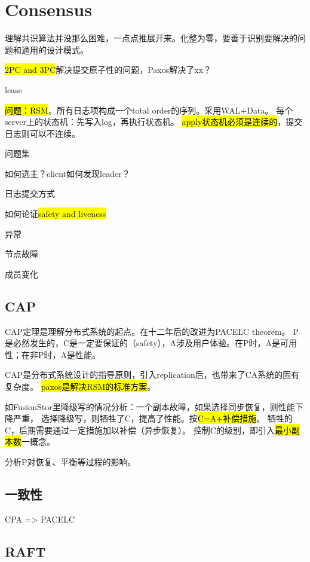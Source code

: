\chapter{Consensus}

理解共识算法并没那么困难，一点点推展开来。化整为零，要善于识别要解决的问题和通用的设计模式。

\hl{2PC and 3PC}解决提交原子性的问题，Paxos解决了xx？

lease

\hl{问题：RSM}。所有日志项构成一个total order的序列。采用WAL+Data。
每个server上的状态机：先写入log，再执行状态机。
\hl{apply状态机必须是连续的}，提交日志则可以不连续。

问题集
\begin{enumbox}
\item 如何选主？client如何发现leader？
\item 日志提交方式
\item 如何论证\hl{safety and liveness}
\end{enumbox}

异常
\begin{enumbox}
\item 节点故障
\item 成员变化
\end{enumbox}

\section{CAP}

CAP定理是理解分布式系统的起点。在十二年后的改进为PACELC theorem。
P是必然发生的，C是一定要保证的（safety），A涉及用户体验。在P时，A是可用性；在非P时，A是性能。

CAP是分布式系统设计的指导原则，引入replication后，也带来了CA系统的固有复杂度。
\hl{paxos是解决RSM的标准方案}。

\hrulefill

如FusionStor里降级写的情况分析：一个副本故障，如果选择同步恢复，则性能下降严重，
选择降级写，则牺牲了C，提高了性能。按\hl{C=A+补偿措施}。
牺牲的C，后期需要通过一定措施加以补偿（异步恢复）。
控制C的级别，即引入\hl{最小副本数}一概念。

分析P对恢复、平衡等过程的影响。

\section{一致性}

CPA => PACELC

\section{RAFT}

